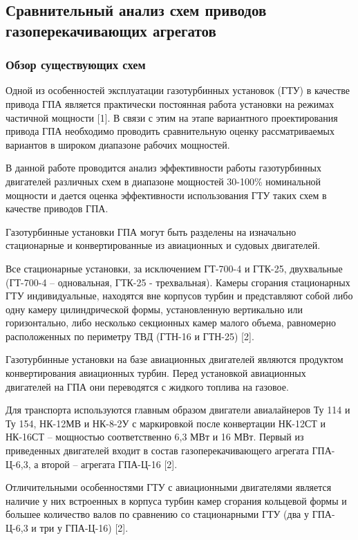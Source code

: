\subsection{Сравнительный анализ схем приводов газоперекачивающих агрегатов} %
\label{sub:сравнительный_анализ_схем_приводов_газоперекачивающих_агрегатов}

\subsubsection{Обзор существующих схем}
Одной из особенностей эксплуатации газотурбинных установок (ГТУ) в качестве привода ГПА является практически постоянная работа установки на режимах частичной мощности [1]. В связи с этим на этапе вариантного проектирования привода ГПА необходимо проводить сравнительную оценку рассматриваемых вариантов в широком диапазоне рабочих мощностей.

В данной работе проводится анализ эффективности работы газотурбинных двигателей различных схем в диапазоне мощностей 30-100\% номинальной мощности и дается оценка эффективности использования ГТУ таких схем в качестве приводов ГПА.

Газотурбинные установки ГПА могут быть разделены на изначально стационарные и конвертированные из авиационных и судовых двигателей.

Все стационарные установки, за исключением ГТ-700-4 и ГТК-25, двухвальные (ГТ-700-4 – одновальная, ГТК-25 - трехвальная). Камеры сгорания стационарных ГТУ индивидуальные, находятся вне корпусов турбин и представляют собой либо одну камеру цилиндрической формы, установленную вертикально или горизонтально, либо несколько секционных камер малого объема, равномерно расположенных по периметру ТВД (ГТН-16 и ГТН-25) [2].

Газотурбинные установки на базе авиационных двигателей являются продуктом конвертирования авиационных турбин. Перед установкой авиационных двигателей на ГПА они переводятся с жидкого топлива на газовое.

Для транспорта используются главным образом двигатели авиалайнеров Ту 114 и Ту 154, НК-12МВ и НК-8-2У с маркировкой после конвертации НК-12СТ и НК-16СТ – мощностью соответственно 6,3 МВт и 16 МВт. Первый из приведенных двигателей входит в состав газоперекачивающего агрегата ГПА-Ц-6,3, а второй – агрегата ГПА-Ц-16 [2].

Отличительными особенностями ГТУ с авиационными двигателями является наличие у них встроенных в корпуса турбин камер сгорания кольцевой формы и большее количество валов по сравнению со стационарными ГТУ (два у ГПА-Ц-6,3 и три у ГПА-Ц-16) [2].

